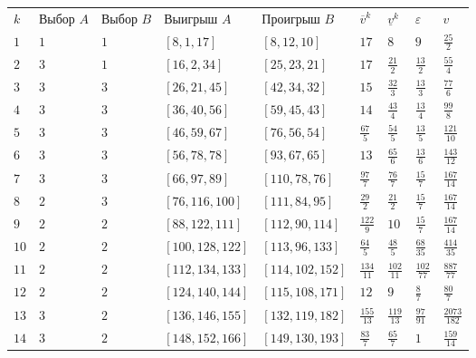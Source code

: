\documentclass[12pt]{extarticle}
\begin{document}
    \begin{longtable}{lllllllll}
$k$ & Выбор $A$ & Выбор $B$ & Выигрыш $A$ & Проигрыш $B$ & $\overline{v}^{k}$ & $\underline{v}^{k}$ & $\varepsilon$ & $v$ \\
$1$ & $1$ & $1$ & $\left[8, 1, 17\right]$ & $\left[8, 12, 10\right]$ & $17$ & $8$ & $9$ & $\frac{25}{2}$ \\
$2$ & $3$ & $1$ & $\left[16, 2, 34\right]$ & $\left[25, 23, 21\right]$ & $17$ & $\frac{21}{2}$ & $\frac{13}{2}$ & $\frac{55}{4}$ \\
$3$ & $3$ & $3$ & $\left[26, 21, 45\right]$ & $\left[42, 34, 32\right]$ & $15$ & $\frac{32}{3}$ & $\frac{13}{3}$ & $\frac{77}{6}$ \\
$4$ & $3$ & $3$ & $\left[36, 40, 56\right]$ & $\left[59, 45, 43\right]$ & $14$ & $\frac{43}{4}$ & $\frac{13}{4}$ & $\frac{99}{8}$ \\
$5$ & $3$ & $3$ & $\left[46, 59, 67\right]$ & $\left[76, 56, 54\right]$ & $\frac{67}{5}$ & $\frac{54}{5}$ & $\frac{13}{5}$ & $\frac{121}{10}$ \\
$6$ & $3$ & $3$ & $\left[56, 78, 78\right]$ & $\left[93, 67, 65\right]$ & $13$ & $\frac{65}{6}$ & $\frac{13}{6}$ & $\frac{143}{12}$ \\
$7$ & $3$ & $3$ & $\left[66, 97, 89\right]$ & $\left[110, 78, 76\right]$ & $\frac{97}{7}$ & $\frac{76}{7}$ & $\frac{15}{7}$ & $\frac{167}{14}$ \\
$8$ & $2$ & $3$ & $\left[76, 116, 100\right]$ & $\left[111, 84, 95\right]$ & $\frac{29}{2}$ & $\frac{21}{2}$ & $\frac{15}{7}$ & $\frac{167}{14}$ \\
$9$ & $2$ & $2$ & $\left[88, 122, 111\right]$ & $\left[112, 90, 114\right]$ & $\frac{122}{9}$ & $10$ & $\frac{15}{7}$ & $\frac{167}{14}$ \\
$10$ & $2$ & $2$ & $\left[100, 128, 122\right]$ & $\left[113, 96, 133\right]$ & $\frac{64}{5}$ & $\frac{48}{5}$ & $\frac{68}{35}$ & $\frac{414}{35}$ \\
$11$ & $2$ & $2$ & $\left[112, 134, 133\right]$ & $\left[114, 102, 152\right]$ & $\frac{134}{11}$ & $\frac{102}{11}$ & $\frac{102}{77}$ & $\frac{887}{77}$ \\
$12$ & $2$ & $2$ & $\left[124, 140, 144\right]$ & $\left[115, 108, 171\right]$ & $12$ & $9$ & $\frac{8}{7}$ & $\frac{80}{7}$ \\
$13$ & $3$ & $2$ & $\left[136, 146, 155\right]$ & $\left[132, 119, 182\right]$ & $\frac{155}{13}$ & $\frac{119}{13}$ & $\frac{97}{91}$ & $\frac{2073}{182}$ \\
$14$ & $3$ & $2$ & $\left[148, 152, 166\right]$ & $\left[149, 130, 193\right]$ & $\frac{83}{7}$ & $\frac{65}{7}$ & $1$ & $\frac{159}{14}$ \\

\end{longtable}
\end{document}
